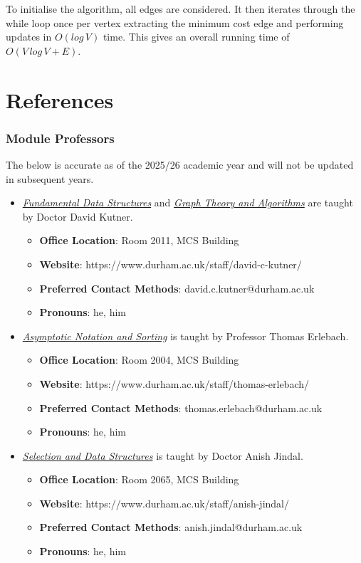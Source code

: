 \documentclass{article}
\begin{document}
\noindent To initialise the algorithm, all edges are considered. It then iterates through the while loop once per vertex extracting the minimum cost edge and performing updates in \(O(log\,V)\) time. This gives an overall running time of \(O(V\,log\,V + E)\).

\newpage\part{References}

\section{Module Professors}

The below is accurate as of the 2025/26 academic year and will not be updated in subsequent years.
\begin{itemize}
    \item \hyperref[part:1.fds]{\textit{Fundamental Data Structures}} and \hyperref[part:4.gta]{\textit{Graph Theory and Algorithms}} are taught by Doctor David Kutner.
    \begin{itemize}
        \item \textbf{Office Location}: Room 2011, MCS Building
        \item \textbf{Website}: https://www.durham.ac.uk/staff/david-c-kutner/
        \item \textbf{Preferred Contact Methods}: david.c.kutner@durham.ac.uk
        \item \textbf{Pronouns}: he, him
    \end{itemize}
    
    \item \hyperref[part:2.ans]{\textit{Asymptotic Notation and Sorting}} is taught by Professor Thomas Erlebach.
    \begin{itemize}
        \item \textbf{Office Location}: Room 2004, MCS Building
        \item \textbf{Website}: https://www.durham.ac.uk/staff/thomas-erlebach/
        \item \textbf{Preferred Contact Methods}: thomas.erlebach@durham.ac.uk
        \item \textbf{Pronouns}: he, him
    \end{itemize}
    
    \item \hyperref[part:3.sds]{\textit{Selection and Data Structures}} is taught by Doctor Anish Jindal.
    \begin{itemize}
        \item \textbf{Office Location}: Room 2065, MCS Building
        \item \textbf{Website}: https://www.durham.ac.uk/staff/anish-jindal/
        \item \textbf{Preferred Contact Methods}: anish.jindal@durham.ac.uk
        \item \textbf{Pronouns}: he, him
    \end{itemize}
\end{itemize}
\end{document}
